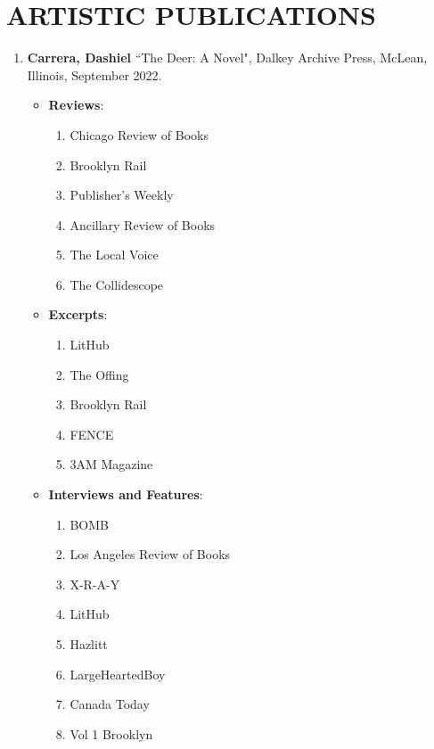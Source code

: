  \section{ARTISTIC PUBLICATIONS}
 \begin{enumerate}
 
\subsection{Novels}
\item \textbf{Carrera, Dashiel} ``The Deer: A Novel", Dalkey Archive Press, McLean, Illinois, September 2022. \\
    \begin{itemize}
        \item \textbf{Reviews}:
        \begin{enumerate}
            \item Chicago Review of Books
            \item Brooklyn Rail
            \item Publisher's Weekly
            \item Ancillary Review of Books
            \item The Local Voice
            \item The Collidescope
        \end{enumerate}
        \item \textbf{Excerpts}:
        \begin{enumerate}
            \item LitHub
            \item The Offing
            \item Brooklyn Rail
            \item FENCE
            \item 3AM Magazine
        \end{enumerate}
        \item \textbf{Interviews and Features}:
        \begin{enumerate}
            \item BOMB
            \item Los Angeles Review of Books
            \item X-R-A-Y
            \item LitHub
            \item Hazlitt
            \item LargeHeartedBoy
            \item Canada Today
            \item Vol 1 Brooklyn

\end{enumerate}
\end{itemize}
\end{enumerate}
